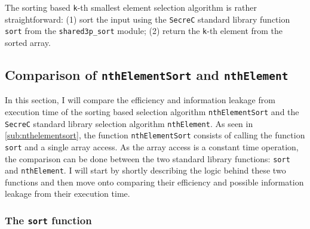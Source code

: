 \documentclass[11pt]{article}
\newcommand{\ct}[1]{\texttt{#1}}
\newcommand{\SC}{\ct{SecreC}\xspace}
\begin{document}
The sorting based \ct{k}-th smallest element selection algorithm is rather straightforward: (1) sort the input using the \SC standard library function \ct{sort} from the \ct{shared3p\_sort} module; (2) return the \ct{k}-th element from the sorted array. 




\subsection{Comparison of \ct{nthElementSort} and \ct{nthElement}} %
\label{sub:comparison_of_nthelementsort_and_nthelement}

In this section, I will compare the efficiency and information leakage from execution time of the sorting based selection algorithm \ct{nthElementSort} and the \SC standard library selection algorithm \ct{nthElement}. As seen in \cref{sub:nthelementsort}, the function \ct{nthElementSort} consists of calling the function \ct{sort} and a single array access. As the array access is a constant time operation, the comparison can be done between the two standard library functions: \ct{sort} and \ct{nthElement}. I will start by shortly describing the logic behind these two functions and then move onto comparing their efficiency and possible information leakage from their execution time.

\subsubsection{The \ct{sort} function} %
\label{ssub:the_sort_function}
 
\end{document}

